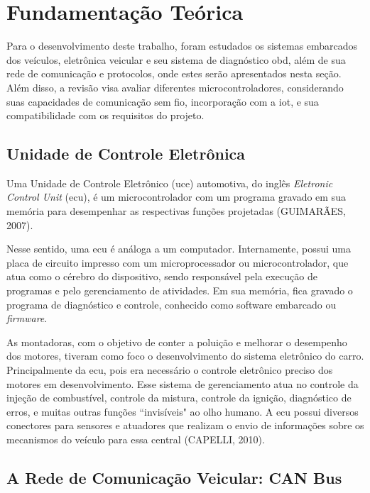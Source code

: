 \documentclass[a4paper, 12pt]{article}
\begin{document}
\clearpage

\section{Fundamentação Teórica}

Para o desenvolvimento deste trabalho, foram estudados os sistemas embarcados dos veículos, eletrônica veicular e seu sistema de diagnóstico \acrshort{obd}, além de sua rede de comunicação e protocolos, onde estes serão apresentados nesta seção. Além disso, a revisão visa avaliar diferentes microcontroladores, considerando suas capacidades de comunicação sem fio, incorporação com a \acrshort{iot}, e sua compatibilidade com os requisitos do projeto.

\subsection{Unidade de Controle Eletrônica}

Uma Unidade de Controle Eletrônico (\acrshort{uce}) automotiva, do inglês \textit{Eletronic Control Unit} (\acrshort{ecu}), é um microcontrolador com um programa gravado em sua memória para desempenhar as respectivas funções projetadas (GUIMARÃES, 2007).

Nesse sentido, uma \acrshort{ecu} é análoga a um computador. Internamente, possui uma placa de circuito impresso com um microprocessador ou microcontrolador, que atua como o cérebro do dispositivo, sendo responsável pela execução de programas e pelo gerenciamento de atividades. Em sua memória, fica gravado o programa de diagnóstico e controle, conhecido como software embarcado ou \textit{firmware}.

As montadoras, com o objetivo de conter a poluição e melhorar o desempenho dos motores, tiveram como foco o desenvolvimento do sistema eletrônico do carro. Principalmente da \acrshort{ecu}, pois era necessário o controle eletrônico preciso dos motores em desenvolvimento. Esse sistema de gerenciamento atua no controle da injeção de combustível, controle da mistura, controle da ignição, diagnóstico de erros, e muitas outras funções ``invisíveis" ao olho humano. A \acrshort{ecu} possui diversos conectores para sensores e atuadores que realizam o envio de informações sobre os mecanismos do veículo para essa central (CAPELLI, 2010).

\subsection{A Rede de Comunicação Veicular: CAN Bus}
\end{document}
